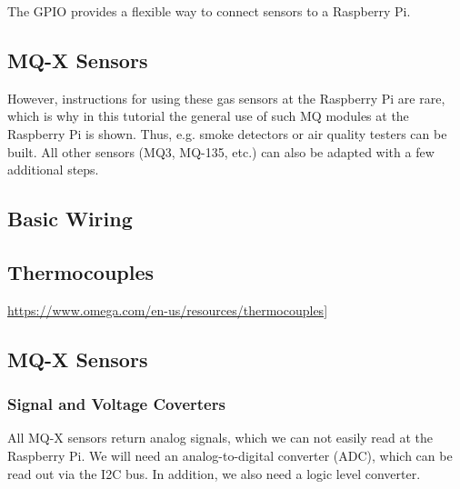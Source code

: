 \documentclass{article}\usepackage[]{graphicx}\usepackage[]{color}
\begin{document}
The GPIO provides a flexible way to connect sensors to a Raspberry Pi. 

\subsection{MQ-X Sensors}

However, instructions for using these gas sensors at the Raspberry Pi are rare, which is why in this tutorial the general use of such MQ modules at the Raspberry Pi is shown. Thus, e.g. smoke detectors or air quality testers can be built. All other sensors (MQ3, MQ-135, etc.) can also be adapted with a few additional steps.

\subsection{Basic Wiring}




\subsection{Thermocouples}

\href{Thermocouples Sensors}{https://www.omega.com/en-us/resources/thermocouples]}


\subsection{MQ-X Sensors}

\subsubsection{Signal and Voltage Coverters}

All MQ-X sensors return analog signals, which we can not easily read at the Raspberry Pi. We will need an analog-to-digital converter (ADC), which can be read out via the I2C bus. In addition, we also need a logic level converter.
\end{document}

